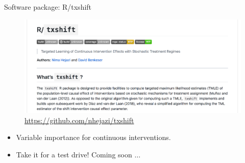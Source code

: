 \documentclass[12pt,t]{beamer}
\begin{document}

\begin{frame}[c]{Software package: R/txshift}

\begin{figure}[H]
  \centering
  \includegraphics[width=\textwidth]{txshift}
  \caption{
    \url{https://github.com/nhejazi/txshift}
  }
\end{figure}

\begin{center}
\begin{itemize}
  \itemsep4pt
  \item Variable importance for continuous interventions.
  \item Take it for a test drive! Coming soon $\ldots$
\end{itemize}
\end{center}


\end{frame}

\end{document}
